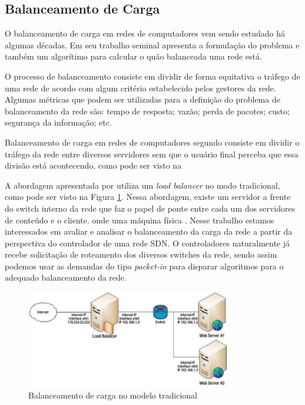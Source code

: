 \documentclass[12pt]{article}
\begin{document}
\subsection{Balanceamento de Carga}

O balanceamento de carga em redes de computadores vem sendo estudado há algumas décadas. Em seu trabalho seminal \cite{Stentz1988} apresenta a formulação do problema e também um algorítimo para calcular o quão balanceada uma rede está.

O processo de balanceamento consiste em dividir de forma equitativa o tráfego de uma rede de acordo com algum critério estabelecido pelos gestores da rede. Algumas métricas que podem ser utilizadas para a definição do problema de balanceamento da rede são: tempo de resposta; vazão; perda de pacotes; custo; segurança da informação; etc.

Balanceamento de carga em redes de computadores segundo \cite{Peter2012} consiste em dividir o tráfego da rede entre diversos servidores sem que o usuário final perceba que essa divisão está acontecendo, como pode ser visto na  

A abordagem apresentada por \cite{Peter2012} utiliza um \textit{load balancer} no modo tradicional, como pode ser visto na Figura \ref{fig:balanceamento_carga_tradicional}. Nessa abordagem, existe um servidor a frente do switch interno da rede que faz o papel de ponte entre cada um dos servidores de conteúdo e o cliente. onde uma máquina física . Nesse trabalho estamos interessados em avaliar e analisar o balanceamento da carga da rede a partir da perspectiva do controlador de uma rede SDN. O controladores naturalmente já recebe solicitação de roteamento dos diversos switches da rede, sendo assim podemos usar as demandas do tipo \textit{packet-in} para disparar algoritmos para o adequado balanceamento da rede.

\begin{figure}[ht]
\centering
\includegraphics[width=0.8\textwidth]{images/load_balance.png}
\caption{Balanceamento de carga no modelo tradicional \cite{Peter2012}}
\label{fig:balanceamento_carga_tradicional}
\end{figure}
\end{document}
